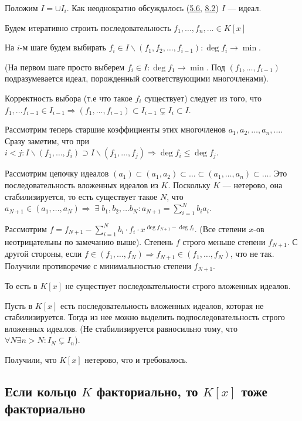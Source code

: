 \documentclass[../main.tex]{subfiles}
\begin{document}
    Положим $I = \cup I_i$. Как неоднократно обсуждалось (\hyperlink{5.6}{5.6},
    \hyperlink{8.2}{8.2}) $I$ --- идеал.

    Будем итеративно строить последовательность
    $f_1, \ldots, f_n, \ldots \in K[x]$

    На $i$-м шаге будем выбирать
    $f_i \in I \backslash (f_1, f_2, \ldots, f_{i - 1}): \deg f_i \to \min$.

    (На первом шаге просто выберем $f_i \in I: \deg f_1 \to \min$.
    Под $(f_1, \ldots, f_{i - 1})$ подразумевается идеал, порожденный
    соответствующими многочленами).

    Корректность выбора (т.е что такое $f_i$ существует) следует из того, что
    $f_1, \ldots f_{i - 1} \in
    I_{i - 1} \Rightarrow (f_1, \ldots, f_{i - 1}) \subset I_{i - 1}
    \subsetneq I_i \subset I$.

    Рассмотрим теперь старшие коэффициенты этих многочленов
    $a_1, a_2, \ldots, a_n, \ldots$. Сразу заметим, что при $i < j:
    I \backslash (f_1, \ldots, f_i) \supset I \backslash (f_1, \ldots, f_j)
    \Rightarrow \deg f_i \leqslant \deg f_j$.

    Рассмотрим цепочку идеалов $(a_1) \subset (a_1, a_2) \subset \ldots
    \subset (a_1, \ldots, a_n) \subset \ldots $. Это последовательность
    вложенных идеалов из $K$. Поскольку $K$ --- нетерово, она стабилизируется,
    то есть существует такое $N$, что $a_{N + 1} \in (a_1, \ldots, a_N)
    \Rightarrow \; \exists \; b_1, b_2, \ldots b_N: a_{N + 1}
    = \sum\limits_{i = 1}^N b_i a_i$.

    Рассмотрим $f = f_{N + 1} - \sum\limits_{i = 1}^N b_i \cdot f_i \cdot
    x^{\deg f_{N + 1} - \deg f_i}$. (Все степени $x$-ов неотрицательны
    по замечанию выше). Степень $f$ строго меньше степени $f_{N + 1}$. С другой
    стороны, если $f \in (f_1, \ldots, f_N) \Rightarrow f_{N + 1} \in
    (f_1, \ldots, f_N)$, что не так. Получили противоречие с минимальностью
    степени $f_{N + 1}$.

    То есть в $K[x]$ не существует последовательности строго вложенных идеалов.

    Пусть в $K[x]$ есть последовательность вложенных идеалов, которая
    не стабилизируется. Тогда из нее можно выделить подпоследовательность
    строго вложенных идеалов. (Не стабилизируется равносильно тому, что
    $\forall N \exists n > N: I_N \subsetneq I_n$).

    Получили, что $K[x]$ нетерово, что и требовалось.


\hypertarget{9.3}{\subsection{Если кольцо $K$ факториально, то $K[x]$
    тоже факториально}}
\end{document}
